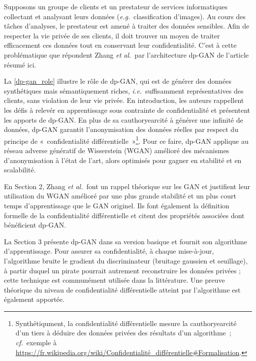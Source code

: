 \documentclass[a4paper,11pt]{article}
\theoremstyle{definition}
\newcommand{\eg}{\textit{e.g.}}
\newcommand{\ie}{\textit{i.e.}}
\newcommand{\etal}{\textit{et al.}}
\newcommand{\cf}{\textit{cf.}}
\begin{document}
\begin{multicols}{2}

Supposons un groupe de clients et un prestateur de services informatiques collectant et analysant leurs données (\eg\ classification d'images). Au cours des tâches d'analyses, le prestateur est amené à traiter des données sensibles. Afin de respecter la vie privée de ses clients, il doit trouver un moyen de traiter efficacement ces données tout en conservant leur confidentialité. C'est à cette problématique que répondent Zhang \etal\ par l'architecture dp-GAN de l'article résumé ici.

La \autoref{dp-gan_role} illustre le rôle de dp-GAN, qui est de générer des données synthétiques mais sémantiquement riches, \ie\ suffisamment représentatives des clients, sans violation de leur vie privée.
En introduction, les auteurs rappellent les défis à relevér en apprentissage sous contrainte de confidentialité et présentent les apports de dp-GAN. En plus de sa cauthoryearcité à générer une infinité de données, dp-GAN garantit l'anonymisation des données réelles par respect du principe de « confidentialité différentielle »\footnote{Synthétiqument, la confidentialité différentielle mesure la cauthoryearcité d'un tiers à déduire des données privées des résultats d'un algorithme ; \cf\ exemple à \url{https://fr.wikipedia.org/wiki/Confidentialité_différentielle#Formalisation}.}.
Pour ce faire, dp-GAN applique au réseau adverse génératif de Wisserstein (WGAN) amélioré des mécanismes d'anonymisation à l'état de l'art, alors optimisés pour gagner en stabilité et en scalabilité.

En Section 2, Zhang \etal\ font un rappel théorique sur les GAN et justifient leur utilisation du WGAN amélioré par une plus grande stabilité et un plus court temps d'apprentissage que le GAN originel. Ils font également la définition formelle de la confidentialité différentielle et citent des propriétés associées dont bénéficient dp-GAN.

La Section 3 présente dp-GAN dans sa version basique et fournit son algorithme d'apprentissage. Pour assurer sa confidentialité, à chaque mise-à-jour, l'algorithme bruite le gradient du discriminateur (bruitage gaussien et seuillage), à partir duquel un pirate pourrait autrement reconstruire les données privées ; cette technique est communément utilisée dans la littérature. Une preuve théorique du niveau de confidentialité différentielle atteint par l'algorithme est également apportée.


\end{multicols}
\end{document}

